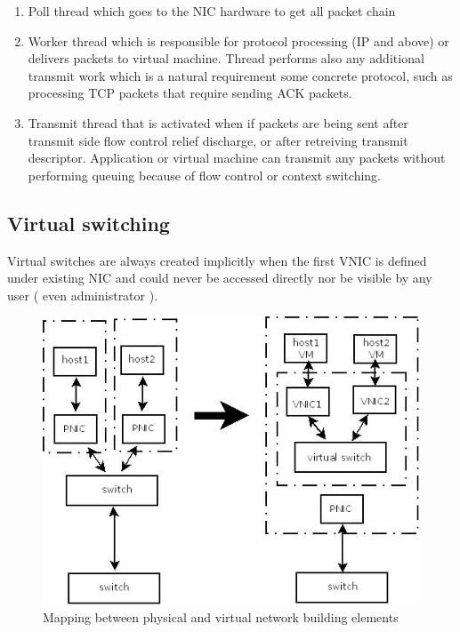 \documentclass[11pt]{book}
\begin{document}
			\begin{enumerate}
				\item{Poll thread which goes to the NIC hardware to get all packet chain}
				\item{Worker thread which is responsible for protocol processing (IP and above) or delivers packets to virtual machine. Thread performs also any additional transmit work which is a natural 
				requirement some concrete protocol, such as processing TCP packets that require sending ACK packets.}
				\item{Transmit thread that is activated when if packets are being sent after transmit side flow control relief discharge, or after retreiving transmit descriptor. Application or virtual 
				machine can transmit any packets without performing queuing because of flow control or context switching.}
			\end{enumerate}

    \subsection{Virtual switching}
			
			Virtual switches are always created implicitly when the first VNIC is defined under existing NIC and could never be accessed directly nor be visible by
			any user ( even administrator ). 
			
			\begin{figure}[H]
				\includegraphics[width=\textwidth]{img/physical_and_virtual_switches_mapping.jpeg}
				\caption{Mapping between physical and virtual network building elements}
			\end{figure}
			
\end{document}
